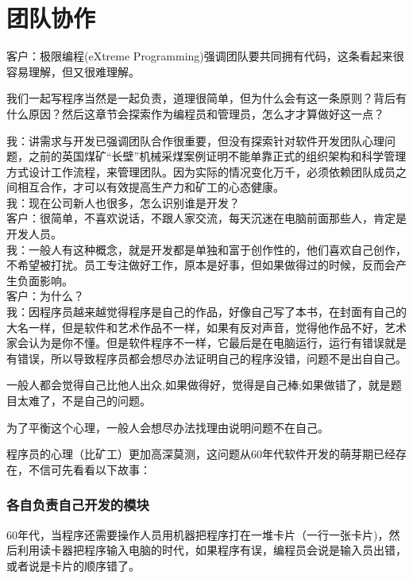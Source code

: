 \chapter{团队协作} %

客户：极限编程(eXtreme Programming)强调团队要共同拥有代码，这条看起来很容易理解，但又很难理解。

我们一起写程序当然是一起负责，道理很简单，但为什么会有这一条原则？背后有什么原因？然后这章节会探索作为编程员和管理员，怎么才才算做好这一点？

我：讲需求与开发已强调团队合作很重要，但没有探索针对软件开发团队心理问题，之前的英国煤矿“长壁”机械采煤案例证明不能单靠正式的组织架构和科学管理方式设计工作流程，来管理团队。因为实际的情况变化万千，必须依赖团队成员之间相互合作，才可以有效提高生产力和矿工的心态健康。\\

我：现在公司新人也很多，怎么识别谁是开发？\\
客户：很简单，不喜欢说话，不跟人家交流，每天沉迷在电脑前面那些人，肯定是开发人员。\\
我：一般人有这种概念，就是开发都是单独和富于创作性的，他们喜欢自己创作，不希望被打扰。员工专注做好工作，原本是好事，但如果做得过的时候，反而会产生负面影响。\\
客户：为什么？\\
我：因程序员越来越觉得程序是自己的作品，好像自己写了本书，在封面有自己的大名一样，但是软件和艺术作品不一样，如果有反对声音，觉得他作品不好，艺术家会认为是你不懂。但是软件程序不一样，它最后是在电脑运行，运行有错误就是有错误，所以导致程序员都会想尽办法证明自己的程序没错，问题不是出自自己。

一般人都会觉得自己比他人出众,如果做得好，觉得是自己棒;如果做错了，就是题目太难了，不是自己的问题。

为了平衡这个心理，一般人会想尽办法找理由说明问题不在自己。

程序员的心理（比矿工）更加高深莫测，这问题从60年代软件开发的萌芽期已经存在，不信可先看看以下故事：

\hypertarget{ux5404ux81eaux8d1fux8d23ux81eaux5df1ux5f00ux53d1ux7684ux6a21ux5757}{%
\subsection{各自负责自己开发的模块}\label{ux5404ux81eaux8d1fux8d23ux81eaux5df1ux5f00ux53d1ux7684ux6a21ux5757}}

60年代，当程序还需要操作人员用机器把程序打在一堆卡片（一行一张卡片)，然后利用读卡器把程序输入电脑的时代，如果程序有误，编程员会说是输入员出错，或者说是卡片的顺序错了。\\

